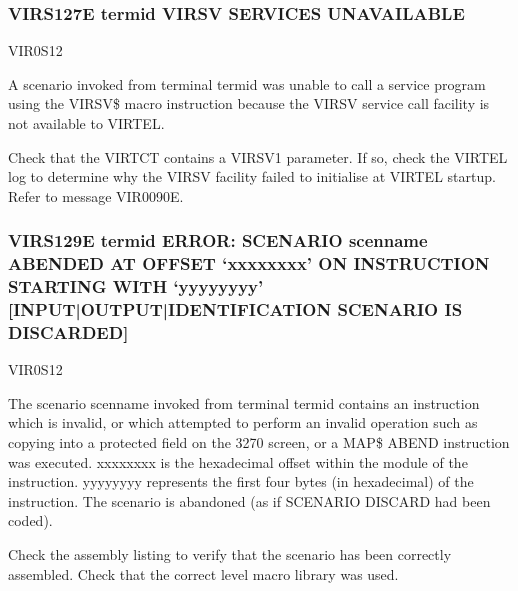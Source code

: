 \documentclass[letterpaper,10pt,english]{sphinxmanual}
\begin{document}
\subsubsection{VIRS127E termid VIRSV SERVICES UNAVAILABLE}
\label{\detokenize{messages:virs127e-termid-virsv-services-unavailable}}\begin{description}
\sphinxAtStartPar
VIR0S12

\sphinxAtStartPar
A scenario invoked from terminal termid was unable to call a service program using the VIRSV\$ macro instruction because the VIRSV service call facility is not available to VIRTEL.

\sphinxAtStartPar
Check that the VIRTCT contains a VIRSV1 parameter. If so, check the VIRTEL log to determine why the VIRSV facility failed to initialise at VIRTEL startup. Refer to message VIR0090E.

\end{description}


\subsubsection{VIRS129E termid ERROR: SCENARIO scenname ABENDED AT OFFSET ‘xxxxxxxx’ ON INSTRUCTION STARTING WITH ‘yyyyyyyy’ {[}INPUT|OUTPUT|IDENTIFICATION SCENARIO IS DISCARDED{]}}
\label{\detokenize{messages:virs129e-termid-error-scenario-scenname-abended-at-offset-xxxxxxxx-on-instruction-starting-with-yyyyyyyy-input-output-identification-scenario-is-discarded}}\begin{description}
\sphinxAtStartPar
VIR0S12

\sphinxAtStartPar
The scenario scenname invoked from terminal termid contains an instruction which is invalid, or which attempted to perform an invalid operation such as copying into a protected field on the 3270 screen, or a MAP\$ ABEND instruction was executed. xxxxxxxx is the hexadecimal offset within the module of the instruction. yyyyyyyy represents the first four bytes (in hexadecimal) of the instruction. The scenario is abandoned (as if SCENARIO DISCARD had been coded).

\sphinxAtStartPar
Check the assembly listing to verify that the scenario has been correctly assembled. Check that the correct level macro library was used.

\end{description}
\end{document}
